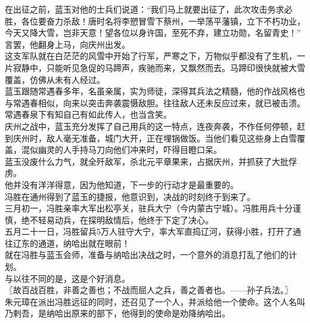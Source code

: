 \begin{multicols}{\theparacolNo}
在出征之前，蓝玉对他的士兵们说道：“我们马上就要出征了，此次攻击务求必胜，各位要奋力杀敌！唐时名将李愬冒雪下蔡州，一举荡平藩镇，立下不朽功业，今天又降大雪，岂非天意！望各位以身许国，至死不弃，建立功勋，名留青史！”\\

言罢，他翻身上马，向庆州出发。\\

这支军队就在白茫茫的风雪中开始了行军，严寒之下，万物似乎都没有了生机，一片寂静中，只能听见急促的马蹄声，疾驰而来，又飘然而去。马蹄印很快就被大雪覆盖，仿佛从未有人经过。\\

蓝玉跟随常遇春多年，名虽亲属，实为师徒，深得其兵法之精髓，他的作战风格也与常遇春相似，向来以突击奔袭震慑敌胆。往往敌人还未反应过来，就已被击溃。\\

常遇春泉下有知自己有如此传人，也当含笑。\\

庆州之战中，蓝玉充分发挥了自己用兵的这一特点，连夜奔袭，不作任何停顿，赶到庆州时，敌人毫无准备，城门大开，正在埋锅做饭。当他们看见这些身上白雪覆盖，混似幽灵的人手持马刀向他们冲来时，吓得目瞪口呆。\\

蓝玉没废什么力气，就全歼敌军，杀北元平章果来，占据庆州，并抓获了大批俘虏。\\

他并没有洋洋得意，因为他知道，下一步的行动才是最重要的。\\

冯胜在通州得到了蓝玉的捷报，他意识到，决战的时刻终于到来了。\\

三月初一，冯胜亲率大军出松亭关，驻兵大宁（今内蒙古宁城）。冯胜用兵十分谨慎，绝不轻易动兵，在探明敌情后，他终于下定了决心。\\

五月二十一日，冯胜留兵5万人驻守大宁，率大军直捣辽河，获得小胜，打开了通往辽东的通道，纳哈出就在眼前！\\

就在冯胜与蓝玉会师，准备与纳哈出决战之时，一个意外的消息打乱了他们的计划。\\

与以往不同的是，这是个好消息。\\

〖故百战百胜，非善之善也；不战而屈人之兵，善之善者也。——孙子兵法。〗\\

朱元璋在派出冯胜远征的同时，还召见了一个人，并派给他一个使命。这个人名叫乃剌吾，是纳哈出原来的部下，他得到的使命是劝降纳哈出。\\


\end{multicols}
